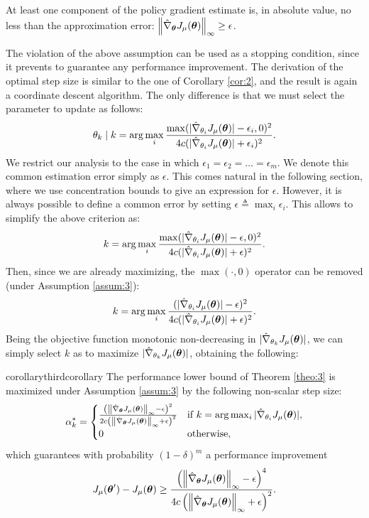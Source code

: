 \begin{assumption}\label{assum:3}
At least one component of the policy gradient estimate is, in absolute value, no less than the approximation error: $\norm[\infty]{\gradApp{\vtheta}} \geq \epsilon$.
\end{assumption}

The violation of the above assumption can be used as a stopping condition, since it prevents to guarantee any performance improvement.
The derivation of the optimal step size is similar to the one of Corollary \ref{cor:2}, and the result is again a coordinate descent algorithm.
The only difference is that we must select the parameter to update as follows:
\[
\theta_k \mid k = \arg \max\limits_i
\frac{\max(|\gradApp{\theta_i}| - \epsilon_i,0)^2}{4c(|\gradApp{\theta_i}| + \epsilon_i)^2}.
\]
We restrict our analysis to the case in which $\epsilon_1=\epsilon_2=\dotsc=\epsilon_m$. We denote this common estimation error simply as $\epsilon$. This comes natural in the following section, where we use concentration bounds to give an expression for $\epsilon$. However, it is always possible to define a common error by setting $\epsilon \triangleq \max_i \epsilon_i$. This allows to simplify the above criterion as:
\[
k = \arg \max\limits_i 
\frac{\max(|\gradApp{\theta_i}| - \epsilon,0)^2}{4c(|\gradApp{\theta_i}| + \epsilon)^2}.
\]
Then, since we are already maximizing, the $\max (\cdot,0)$ operator can be removed (under Assumption \ref{assum:3}):
\[
k = \arg \max\limits_i 
\frac{(|\gradApp{\theta_i}| - \epsilon)^2}{4c(|\gradApp{\theta_i}| + \epsilon)^2}.
\]
Being the objective function monotonic non-decreasing in $|\gradApp{\theta_k}|$, we can simply select $k$ as to maximize $|\gradApp{\theta_k}|$, obtaining the following:

\begin{restatable}{corollary}{thirdcorollary} \label{cor:3}
The performance lower bound of Theorem \ref{theo:3} is maximized under Assumption \ref{assum:3} by the following non-scalar step size:
\[
\alpha_k^* = 
\begin{cases}
	\frac{
		\left(\norm[\infty]{\gradApp{\vtheta}} - \epsilon\right)^2}
		{2c
		\left(\norm[\infty]{\gradApp{\vtheta}} + \epsilon\right)^2} & 
		\text{if } k = \arg\max_i |\gradApp{\theta_i}|,	\\
		0 & \text{otherwise},
\end{cases}
\]
which guarantees with probability $(1-\delta)^m$ a performance improvement
\[
\DeltaJ \geq
\frac{
	\left(\norm[\infty]{\gradApp{\vtheta}} - \epsilon\right)^4}
	{4c
	\left(\norm[\infty]{\gradApp{\vtheta}} + \epsilon\right)^2}.
\]
\end{restatable}


